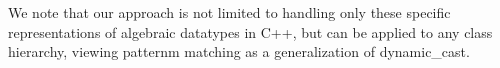 \documentclass[preprint]{sigplanconf}
\begin{document}
We note that our approach is not limited to handling only these specific 
representations of algebraic datatypes in C++, but can be applied to any class 
hierarchy, viewing patternm matching as a generalization of 
dynamic\_cast.



\end{document}
